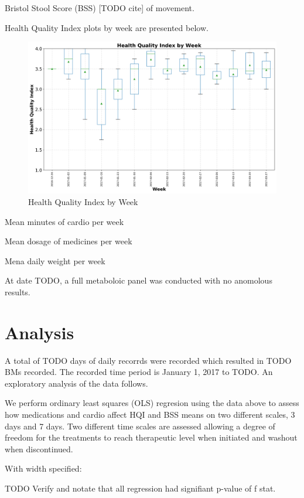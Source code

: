 \documentclass[conference]{IEEEtran}
\begin{document}
Bristol Stool Score (BSS) [TODO cite] of movement.

Health Quality Index plots by week are presented below.

\begin{figure}[t]
    \centering
    \includegraphics[width=\columnwidth]{hqi_box.png}
    \caption{Health Quality Index by Week}\label{fig:hqi}
\end{figure}

Mean minutes of cardio per week

Mean dosage of medicines per week

Mena daily weight per week

At date TODO, a full metaboloic panel was conducted with no anomolous results.


\section{Analysis}

A total of TODO days of daily recorrds were recorded which resulted in TODO BMs recorded.  The recorded time period is January 1, 2017 to TODO.  An exploratory analysis of the data follows.

We perform ordinary least squares (OLS) regresion using the data above to assess how medications and cardio affect HQI and BSS means on two different scales, 3 days and 7 days.  Two different time scales are assessed allowing a degree of freedom for the treatments to reach therapeutic level when initiated and washout when discontinued.

With width specified:

TODO Verify and notate that all regression had signifiant p-value of f stat.
\end{document}
